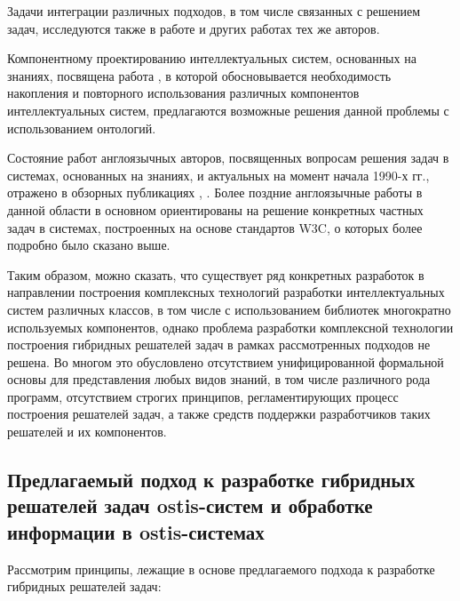 Задачи интеграции различных подходов, в том числе связанных с решением задач, исследуются также в работе  и других работах тех же авторов.

Компонентному проектированию интеллектуальных систем, основанных на знаниях, посвящена работа , в которой обосновывается необходимость накопления и повторного использования различных компонентов интеллектуальных систем, предлагаются возможные решения данной проблемы с использованием онтологий.

Состояние работ англоязычных авторов, посвященных вопросам решения задач в системах, основанных на знаниях, и актуальных на момент начала 1990-х гг., отражено в обзорных публикациях , . Более поздние англоязычные работы в данной области в основном ориентированы на решение конкретных частных задач в системах, построенных на основе стандартов W3C, о которых более подробно было сказано выше.

Таким образом, можно сказать, что существует ряд конкретных разработок в направлении построения комплексных технологий разработки интеллектуальных систем различных классов, в том числе с использованием библиотек многократно используемых компонентов, однако проблема разработки комплексной технологии построения гибридных решателей задач в рамках рассмотренных подходов не решена. Во многом это обусловлено отсутствием унифицированной формальной основы для представления любых видов знаний, в том числе различного рода программ, отсутствием строгих принципов, регламентирующих процесс построения решателей задач, а также средств поддержки разработчиков таких решателей и их компонентов.

\subsection{Предлагаемый подход к разработке гибридных решателей задач ostis-систем и обработке информации в ostis-системах}
\label{subsec_ps_proposed_approach}

Рассмотрим принципы, лежащие в основе предлагаемого подхода к разработке гибридных решателей задач:

